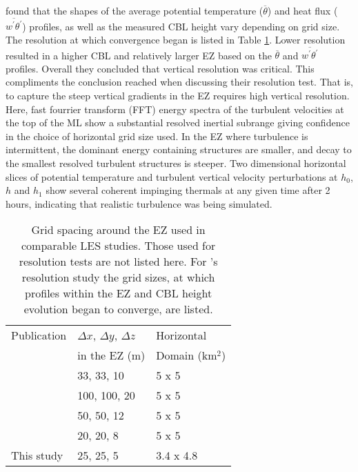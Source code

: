 \cite{SullPat} found that the shapes of the average potential temperature ($\overline{\theta}$) and heat flux ($\overline{w^{'}\theta^{'}}$) profiles, as well as the measured CBL height vary depending on grid size.  The resolution at which convergence began is listed in Table \ref{table:gridcomp}.  Lower resolution resulted in a higher CBL and relatively larger EZ based on the $\overline{\theta}$ and $\overline{w^{'}\theta^{'}}$ profiles.  Overall they concluded that vertical resolution was critical.  This compliments the conclusion \cite{BrooksFowler2} reached when discussing their resolution test.  That is, to capture the steep vertical gradients in the EZ requires high vertical resolution. \\

Here, fast fourrier transform (FFT) energy spectra of the turbulent velocities at the top of the ML show a substantial resolved inertial subrange giving confidence in the choice of horizontal grid size used. In the EZ where turbulence is intermittent, the dominant energy containing structures are smaller, and decay to the smallest resolved turbulent structures is steeper. Two dimensional horizontal slices of potential temperature and turbulent vertical velocity perturbations at $h_{0}$, $h$ and $h_{1}$ show several coherent impinging thermals at any given time after 2 hours, indicating that realistic turbulence was being simulated.\\

\begin{table}[htbp]
\caption[Comparison of Grid-Sizes used in similar Studies]{Grid spacing around the EZ used in comparable LES studies. Those used for resolution tests are not listed here.  For \cite{SullPat}'s resolution study the grid sizes, at which profiles within the EZ and CBL height evolution began to converge, are listed.}

    \begin{tabular}{p{4cm} p{2cm} p{2cm}}
Publication & $\Delta x$, $\Delta y$, $\Delta z$ & Horizontal \\
 & in the EZ (m) & Domain (km$^{2}$) \\ \hline
      \cite{SullMoengStev}& 33, 33, 10 & 5 x 5 \\ %
      \cite{FedConzMir04}& 100, 100, 20 & 5 x 5 \\ %
      \cite{BrooksFowler2}& 50, 50, 12 & 5 x 5 \\%
      \cite{SullPat} &  20, 20, 8 & 5 x 5\\ %
      This study & 25, 25, 5 &  3.4 x 4.8\\ \hline       
    \end{tabular}
\label{table:gridcomp}   
\end{table}

